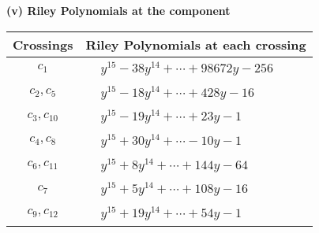 \documentclass[1p]{elsarticle_modified}
\theoremstyle{definition}
\begin{document}
\flushleft \textbf{(v) Riley Polynomials at the component}\newline \\
\begin{tabular}{m{50pt}|m{274pt}}
Crossings & \hspace{64pt}Riley Polynomials at each crossing \\
\hline $$\begin{aligned}c_{1}\end{aligned}$$&$\begin{aligned}
&y^{15}-38 y^{14}+\cdots+98672 y-256
\end{aligned}$\\
\hline $$\begin{aligned}c_{2},c_{5}\end{aligned}$$&$\begin{aligned}
&y^{15}-18 y^{14}+\cdots+428 y-16
\end{aligned}$\\
\hline $$\begin{aligned}c_{3},c_{10}\end{aligned}$$&$\begin{aligned}
&y^{15}-19 y^{14}+\cdots+23 y-1
\end{aligned}$\\
\hline $$\begin{aligned}c_{4},c_{8}\end{aligned}$$&$\begin{aligned}
&y^{15}+30 y^{14}+\cdots-10 y-1
\end{aligned}$\\
\hline $$\begin{aligned}c_{6},c_{11}\end{aligned}$$&$\begin{aligned}
&y^{15}+8 y^{14}+\cdots+144 y-64
\end{aligned}$\\
\hline $$\begin{aligned}c_{7}\end{aligned}$$&$\begin{aligned}
&y^{15}+5 y^{14}+\cdots+108 y-16
\end{aligned}$\\
\hline $$\begin{aligned}c_{9},c_{12}\end{aligned}$$&$\begin{aligned}
&y^{15}+19 y^{14}+\cdots+54 y-1
\end{aligned}$\\
\hline
\end{tabular}\\~\\
\end{document}
